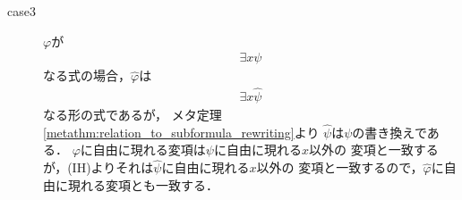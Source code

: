 \begin{metaprf}
\begin{description}
\begin{description}
					\item[case3] $\varphi$が
						\begin{align}
							\exists x \psi
						\end{align}
						なる式の場合，$\hat{\varphi}$は
						\begin{align}
							\exists x \hat{\psi}
						\end{align}
						なる形の式であるが，
						メタ定理\ref{metathm:relation_to_subformula_rewriting}より
						$\hat{\psi}$は$\psi$の書き換えである．
						$\varphi$に自由に現れる変項は$\psi$に自由に現れる$x$以外の
						変項と一致するが，(IH)よりそれは$\hat{\psi}$に自由に現れる$x$以外の
						変項と一致するので，$\hat{\varphi}$に自由に現れる変項とも一致する．
						\QED
				\end{description}
		\end{description}
	\end{metaprf}